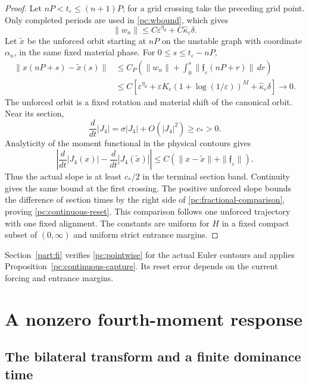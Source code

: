 \documentclass[11pt]{amsart}
\theoremstyle{remark}
\numberwithin{equation}{section}
\begin{document}
\begin{proof}
Let $nP<t_\varepsilon\le(n+1)P$; for a grid crossing take the
preceding grid point. Only completed periods are used in
\eqref{pc:wbound}, which gives
\[
 \|w_n\|\le C\varepsilon^{\eta_d}
       +C\widehat\kappa_\varepsilon\delta.
\]
Let $\widetilde x$ be the unforced orbit starting at $nP$ on
the unstable graph with coordinate $\alpha_n$, in the same fixed
material phase. For $0\le s\le t_\varepsilon-nP$,
\begin{equation}\label{pc:fractional-comparison}
 \begin{split}
 \|x(nP+s)-\widetilde x(s)\|
 &\le C_P\left(\|w_n\|+
       \int_0^s\|\mathfrak f_\varepsilon(nP+r)\|\,dr\right)\\
 &\le C\left[\varepsilon^{\eta_d}
       +\varepsilon K_c(1+\log(1/\varepsilon))^M
       +\widehat\kappa_\varepsilon\delta\right]\longrightarrow0.
 \end{split}
\end{equation}
The unforced orbit is a fixed rotation and material shift of the
canonical orbit. Near its section,
\[
 \frac{d}{dt}|J_4|=\sigma|J_4|+O(|J_4|^2)\ge c_*>0.
\]
Analyticity of the moment functional in the physical contours gives
\[
 \left|\frac{d}{dt}|J_4(x)|-\frac{d}{dt}|J_4(\widetilde x)|\right|
 \le C\left(\|x-\widetilde x\|+\|\mathfrak f_\varepsilon\|\right).
\]
Thus the actual slope is at least $c_*/2$ in the terminal section
band. Continuity gives the same bound at the first crossing.
The positive unforced slope bounds the difference of section times
by the right side of \eqref{pc:fractional-comparison}, proving
\eqref{pc:continuous-reset}. This comparison follows one unforced
trajectory with one fixed alignment. The constants are uniform
for $H$ in a fixed compact subset of $(0,\infty)$ and uniform
strict entrance margins.
\end{proof}

Section~\ref{part:fi} verifies \eqref{pc:pointwise} for the actual
Euler contours and applies Proposition~\ref{pc:continuous-capture}.
Its reset error depends on the current forcing and entrance margins.


\section{A nonzero fourth-moment response}\label{part:nt}
\subsection{The bilateral transform and a finite dominance time}
\end{document}
